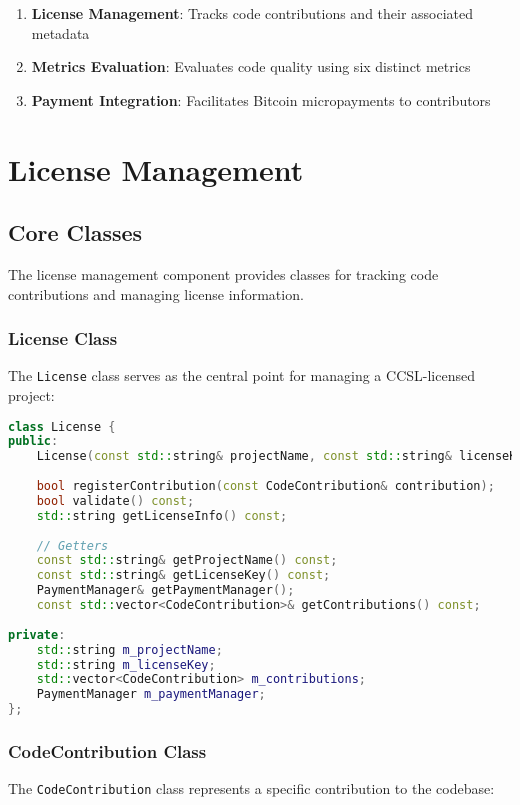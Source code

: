 \documentclass[11pt,a4paper]{report}
\begin{document}
\begin{enumerate}
    \item \textbf{License Management}: Tracks code contributions and their associated metadata
    \item \textbf{Metrics Evaluation}: Evaluates code quality using six distinct metrics
    \item \textbf{Payment Integration}: Facilitates Bitcoin micropayments to contributors
\end{enumerate}

\chapter{License Management}

\section{Core Classes}
The license management component provides classes for tracking code contributions and managing license information.

\subsection{License Class}
The \texttt{License} class serves as the central point for managing a CCSL-licensed project:

\begin{lstlisting}[language=C++]
class License {
public:
    License(const std::string& projectName, const std::string& licenseKey);
    
    bool registerContribution(const CodeContribution& contribution);
    bool validate() const;
    std::string getLicenseInfo() const;
    
    // Getters
    const std::string& getProjectName() const;
    const std::string& getLicenseKey() const;
    PaymentManager& getPaymentManager();
    const std::vector<CodeContribution>& getContributions() const;
    
private:
    std::string m_projectName;
    std::string m_licenseKey;
    std::vector<CodeContribution> m_contributions;
    PaymentManager m_paymentManager;
};
\end{lstlisting}

\subsection{CodeContribution Class}
The \texttt{CodeContribution} class represents a specific contribution to the codebase:
\end{document}

